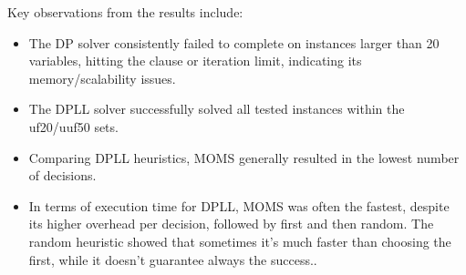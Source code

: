 \documentclass[12pt, a4paper]{article}
\begin{document}


Key observations from the results include:
\begin{itemize}
    \item The DP solver consistently failed to complete on instances larger than 20 variables, hitting the clause or iteration limit, indicating its memory/scalability issues.
    \item The DPLL solver successfully solved all tested instances within the uf20/uuf50 sets.
    \item Comparing DPLL heuristics, MOMS generally resulted in the lowest number of decisions.
    \item In terms of execution time for DPLL, MOMS was often the fastest, despite its higher overhead per decision, followed by first and then random. The random heuristic showed that sometimes it's much faster than choosing the first, while it doesn't guarantee always the success..
\end{itemize}
\end{document}
